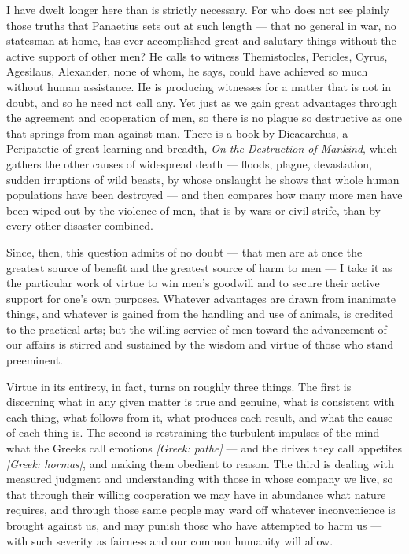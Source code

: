  I have dwelt longer here than is strictly necessary. For who does not see plainly those truths that Panaetius sets out at such length — that no general in war, no statesman at home, has ever accomplished great and salutary things without the active support of other men? He calls to witness Themistocles, Pericles, Cyrus, Agesilaus, Alexander, none of whom, he says, could have achieved so much without human assistance. He is producing witnesses for a matter that is not in doubt, and so he need not call any. Yet just as we gain great advantages through the agreement and cooperation of men, so there is no plague so destructive as one that springs from man against man. There is a book by Dicaearchus, a Peripatetic of great learning and breadth, \textit{On the Destruction of Mankind}, which gathers the other causes of widespread death — floods, plague, devastation, sudden irruptions of wild beasts, by whose onslaught he shows that whole human populations have been destroyed — and then compares how many more men have been wiped out by the violence of men, that is by wars or civil strife, than by every other disaster combined.

 Since, then, this question admits of no doubt — that men are at once the greatest source of benefit and the greatest source of harm to men — I take it as the particular work of virtue to win men's goodwill and to secure their active support for one's own purposes. Whatever advantages are drawn from inanimate things, and whatever is gained from the handling and use of animals, is credited to the practical arts; but the willing service of men toward the advancement of our affairs is stirred and sustained by the wisdom and virtue of those who stand preeminent.

 Virtue in its entirety, in fact, turns on roughly three things. The first is discerning what in any given matter is true and genuine, what is consistent with each thing, what follows from it, what produces each result, and what the cause of each thing is. The second is restraining the turbulent impulses of the mind — what the Greeks call emotions \textit{[Greek: pathe]} — and the drives they call appetites \textit{[Greek: hormas]}, and making them obedient to reason. The third is dealing with measured judgment and understanding with those in whose company we live, so that through their willing cooperation we may have in abundance what nature requires, and through those same people may ward off whatever inconvenience is brought against us, and may punish those who have attempted to harm us — with such severity as fairness and our common humanity will allow.

